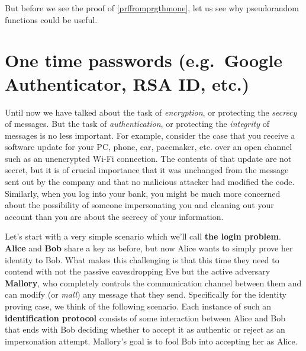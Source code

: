 \hypertarget{prffromprgthmone}{}

But before we see the proof of \cref{prffromprgthmone}, let us see why
pseudorandom functions could be useful.

\section{One time passwords (e.g.~Google Authenticator, RSA ID,
etc.)}\label{4-One-time-passwords-egG}

Until now we have talked about the task of \emph{encryption}, or
protecting the \emph{secrecy} of messages. But the task of
\emph{authentication}, or protecting the \emph{integrity} of messages is
no less important. For example, consider the case that you receive a
software update for your PC, phone, car, pacemaker, etc. over an open
channel such as an unencrypted Wi-Fi connection. The contents of that
update are not secret, but it is of crucial importance that it was
unchanged from the message sent out by the company and that no malicious
attacker had modified the code. Similarly, when you log into your bank,
you might be much more concerned about the possibility of someone
impersonating you and cleaning out your account than you are about the
secrecy of your information.

Let's start with a very simple scenario which we'll call \textbf{the
login problem}. \textbf{Alice} and \textbf{Bob} share a key as before,
but now Alice wants to simply prove her identity to Bob. What makes this
challenging is that this time they need to contend with not the passive
eavesdropping Eve but the active adversary \textbf{Mallory}, who
completely controls the communication channel between them and can
modify (or \emph{mall}) any message that they send. Specifically for the
identity proving case, we think of the following scenario. Each instance
of such an \textbf{identification protocol} consists of some interaction
between Alice and Bob that ends with Bob deciding whether to accept it
as authentic or reject as an impersonation attempt. Mallory's goal is to
fool Bob into accepting her as Alice.

